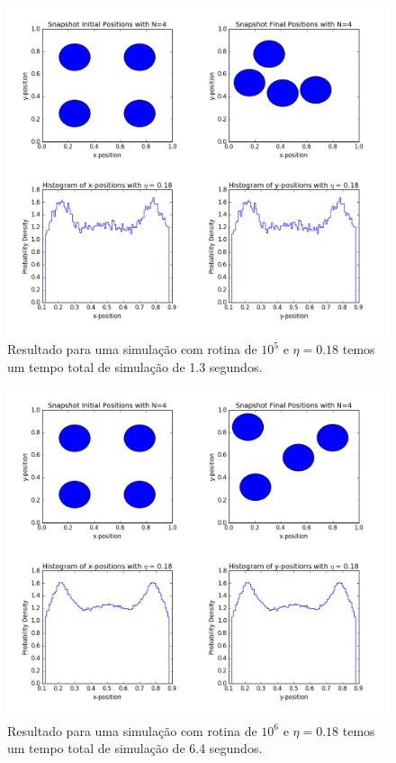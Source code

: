 \documentclass[%
reprint,
amsmath,amssymb,
aps,
12pt
]{revtex4-1}
\begin{document}
\begin{figure}[!h]
	\centering
	\includegraphics[scale=0.23]{mcm1.png}
	\caption{Resultado para uma simulação com rotina de $ 10^5 $ e $ \eta = 0.18 $ temos um tempo total de simulação de 1.3 segundos.
		\label{mcm1}}
\end{figure}
\begin{figure}[!h]
	\centering
	\includegraphics[scale=0.23]{mcm2.png}
	\caption{Resultado para uma simulação com rotina de $ 10^6 $ e $ \eta = 0.18 $ temos um tempo total de simulação de 6.4 segundos.
		\label{mcm2}}
\end{figure}
\end{document}
